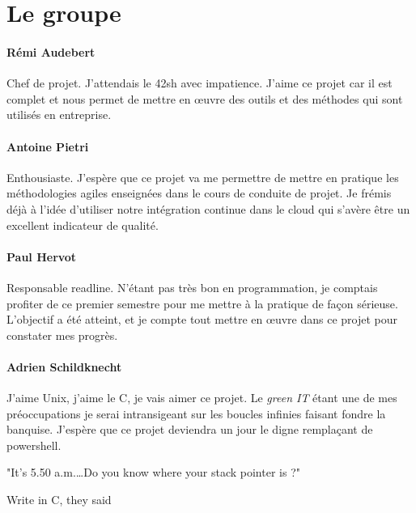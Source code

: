 \section{Le groupe}

\paragraph{Rémi Audebert} Chef de projet. J'attendais le 42sh avec impatience.
J'aime ce projet car il est complet et nous permet de mettre en œuvre des
outils et des méthodes qui sont utilisés en entreprise.

\paragraph{Antoine Pietri} Enthousiaste. J'espère que ce projet va me permettre
de mettre en pratique les méthodologies agiles enseignées dans le cours de
conduite de projet. Je frémis déjà à l'idée d'utiliser notre intégration
continue dans le cloud qui s'avère être un excellent indicateur de qualité.

\paragraph{Paul Hervot} Responsable readline. N'étant pas très bon en
programmation, je comptais profiter de ce premier semestre pour me mettre à la
pratique de façon sérieuse. L'objectif a été atteint, et je compte tout mettre
en œuvre dans ce projet pour constater mes progrès.

\paragraph{Adrien Schildknecht} J'aime Unix, j'aime le C, je vais aimer ce
projet. Le \textit{green IT} étant une de mes préoccupations je serai
intransigeant sur les boucles infinies faisant fondre la banquise.
J'espère que ce projet deviendra un jour le digne remplaçant de powershell.

\epigraph{
         "It's 5.50 a.m.\ldots Do you know where your stack pointer is ?"
}{Write in C, they said}
